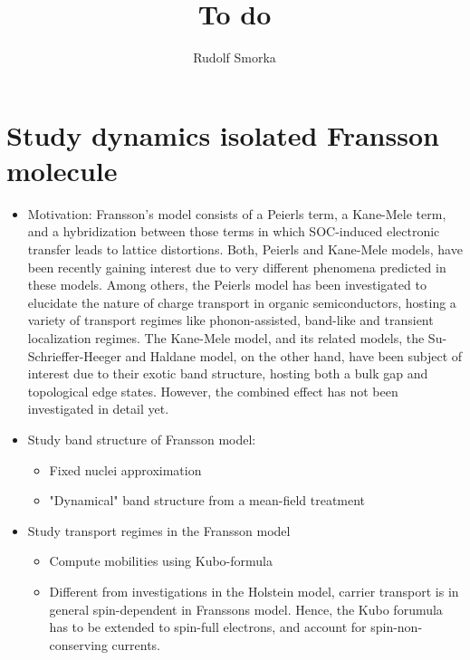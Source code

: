 \documentclass{article}
\begin{document}
\title{To do}
\author{Rudolf Smorka}
\maketitle
\section{Study dynamics isolated Fransson molecule}
\begin{itemize}
	\item Motivation: Fransson's model consists of a Peierls term, a Kane-Mele term, and a hybridization between those terms in which SOC-induced electronic transfer leads to lattice distortions. Both, Peierls and Kane-Mele models, have been recently gaining interest due to very different phenomena predicted in these models. 
	Among others, the Peierls model has been investigated to elucidate the nature of charge transport in organic semiconductors, hosting a variety of transport regimes like phonon-assisted, band-like and transient localization regimes. 
	The Kane-Mele model, and its related models, the Su-Schrieffer-Heeger and Haldane model, on the other hand, have been subject of interest due to their exotic band structure, hosting both a bulk gap and topological edge states. However, the combined effect has not been investigated in detail yet.
	\item Study band structure of Fransson model: 
	\begin{itemize}
		\item Fixed nuclei approximation
		\item "Dynamical" band structure from a mean-field treatment
	\end{itemize}
	\item Study transport regimes in the Fransson model
	\begin{itemize}
		\item Compute mobilities using Kubo-formula
		\item Different from investigations in the Holstein model, carrier transport is in general spin-dependent in Franssons model. Hence, the Kubo forumula has to be extended to spin-full electrons, and account for spin-non-conserving currents.
	\end{itemize}
\end{itemize}
\end{document}
